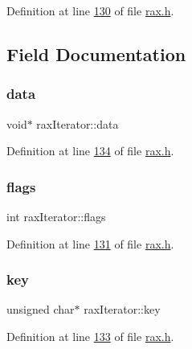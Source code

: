 Definition at line \hyperlink{rax_8h_source_l00130}{130} of file \hyperlink{rax_8h_source}{rax.\+h}.



\subsection{Field Documentation}
\mbox{\label{structraxIterator_afe84813091d47e5fdf2ebca44429c50b}} 
\subsubsection{\texorpdfstring{data}{data}}
{\footnotesize\ttfamily void$\ast$ rax\+Iterator\+::data}



Definition at line \hyperlink{rax_8h_source_l00134}{134} of file \hyperlink{rax_8h_source}{rax.\+h}.

\mbox{\label{structraxIterator_a9296b592aef05d82d78daf6f02853b94}} 
\subsubsection{\texorpdfstring{flags}{flags}}
{\footnotesize\ttfamily int rax\+Iterator\+::flags}



Definition at line \hyperlink{rax_8h_source_l00131}{131} of file \hyperlink{rax_8h_source}{rax.\+h}.

\mbox{\label{structraxIterator_a81d635bee561ef346a6dba3a689fbb82}} 
\subsubsection{\texorpdfstring{key}{key}}
{\footnotesize\ttfamily unsigned char$\ast$ rax\+Iterator\+::key}



Definition at line \hyperlink{rax_8h_source_l00133}{133} of file \hyperlink{rax_8h_source}{rax.\+h}.

\mbox{\label{structraxIterator_ad5f8b329984805ac1a706304c12ce2d3}} 
